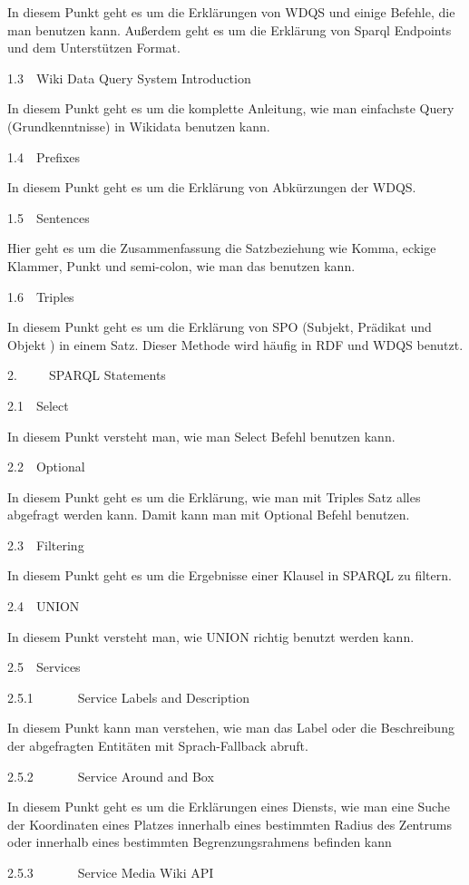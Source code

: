 \documentclass{article}
\begin{document}
In diesem Punkt geht es um die Erklärungen von WDQS und einige Befehle, die man benutzen kann. Außerdem geht es um die Erklärung von Sparql Endpoints und dem Unterstützen Format.


1.3  Wiki Data Query System Introduction 


In diesem Punkt geht es um die komplette Anleitung, wie man einfachste Query (Grundkenntnisse) in Wikidata benutzen kann. 


1.4  Prefixes 


In diesem Punkt geht es um die Erklärung von Abkürzungen der WDQS.


1.5  Sentences


Hier geht es um die Zusammenfassung die Satzbeziehung wie Komma, eckige Klammer, Punkt und semi-colon, wie man das benutzen kann.


1.6  Triples


In diesem Punkt geht es um die Erklärung von SPO (Subjekt, Prädikat und Objekt ) in einem Satz. Dieser Methode wird häufig in RDF und WDQS benutzt.


2.     SPARQL Statements 


2.1  Select


In diesem Punkt versteht man, wie man Select Befehl benutzen kann.


2.2  Optional


In diesem Punkt geht es um die Erklärung, wie man mit Triples Satz alles abgefragt werden kann. Damit kann man mit Optional Befehl benutzen.


2.3  Filtering 


In diesem Punkt geht es um die Ergebnisse einer Klausel in SPARQL zu filtern.


2.4  UNION


In diesem Punkt versteht man, wie UNION richtig benutzt werden kann.


2.5  Services


2.5.1       Service Labels and Description 


In diesem Punkt kann man verstehen, wie man das Label oder die Beschreibung der abgefragten Entitäten mit Sprach-Fallback abruft.


2.5.2       Service Around and Box


In diesem Punkt geht es um die Erklärungen eines Diensts, wie man eine Suche der Koordinaten eines Platzes innerhalb eines bestimmten Radius des Zentrums oder innerhalb eines bestimmten Begrenzungsrahmens befinden kann


2.5.3       Service Media Wiki API
\end{document}

